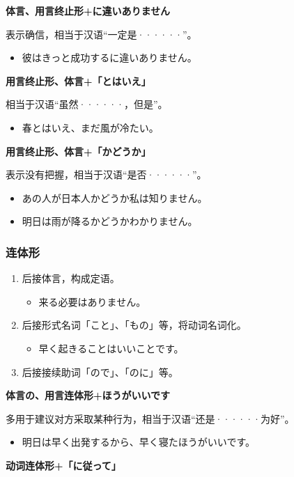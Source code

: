 {\bf
\noindent 体言、用言终止形+に違いありません
}

表示确信，相当于汉语``一定是······''。
\begin{itemize}
  \item 彼はきっと成功するに違いありません。
\end{itemize}

{\bf
\noindent 用言终止形、体言+「とはいえ」
}

相当于汉语``虽然······，但是''。
\begin{itemize}
  \item 春とはいえ、まだ風が冷たい。
\end{itemize}

{\bf
\noindent 用言终止形、体言+「かどうか」
}

表示没有把握，相当于汉语``是否······''。
\begin{itemize}
  \item あの人が日本人かどうか私は知りません。
  \item 明日は雨が降るかどうかわかりません。
\end{itemize}


\subsubsection{连体形}%

\begin{enumerate}
  \item 后接体言，构成定语。
    \begin{itemize}
      \item 来る必要はありません。
    \end{itemize}
  \item 后接形式名词「こと」、「もの」等，将动词名词化。
    \begin{itemize}
      \item 早く起きることはいいことです。
    \end{itemize}
  \item 后接接续助词「ので」、「のに」等。
\end{enumerate}

{\bf
\noindent 体言の、用言连体形+ほうがいいです
}

多用于建议对方采取某种行为，相当于汉语``还是······为好''。
\begin{itemize}
  \item 明日は早く出発するから、早く寝たほうがいいです。
\end{itemize}

{\bf
\noindent 动词连体形+「に従って」
}

